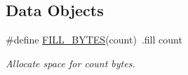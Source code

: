 \subsection*{Data Objects}
\begin{DoxyCompactItemize}
\item 
\hypertarget{group__assembler__group_ga3ab35e172e72f27c4210f5009fb35202}{\#define \hyperlink{group__assembler__group_ga3ab35e172e72f27c4210f5009fb35202}{F\-I\-L\-L\-\_\-\-B\-Y\-T\-E\-S}(count)~.fill   count}\label{group__assembler__group_ga3ab35e172e72f27c4210f5009fb35202}

\begin{DoxyCompactList}\small\item\em Allocate space for {\itshape count} bytes. \end{DoxyCompactList}\end{DoxyCompactItemize}
